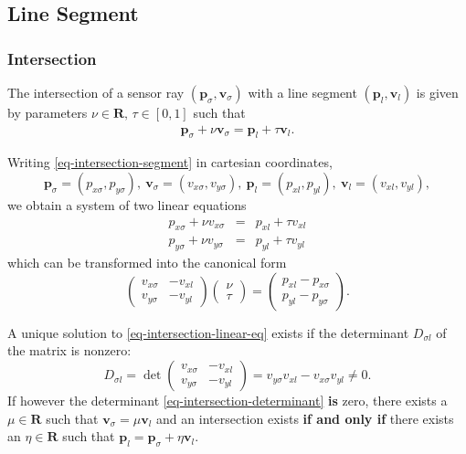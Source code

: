\documentclass[11pt]{article}
\newcommand{\Dsigl}{D_{\sigma l}}
\newcommand{\pbl}{\mathbf{p}_l}
\newcommand{\pbsig}{\mathbf{p}_\sigma}
\newcommand{\pxl}{p_{xl}}
\newcommand{\pyl}{p_{yl}}
\newcommand{\pxsig}{p_{x\sigma}}
\newcommand{\pysig}{p_{y\sigma}}
\newcommand{\Rb}{\mathbf{R}}
\newcommand{\vbl}{\mathbf{v}_l}
\newcommand{\vxl}{v_{xl}}
\newcommand{\vyl}{v_{yl}}
\newcommand{\vbsig}{\mathbf{v}_\sigma}
\newcommand{\vxsig}{v_{x\sigma}}
\newcommand{\vysig}{v_{y\sigma}}
\begin{document}
\subsection{Line Segment}
\label{sec-intersection-line-segment}

\subsubsection*{Intersection}

The intersection of a sensor ray $(\pbsig,\vbsig)$ with a line segment
$(\pbl,\vbl)$ is given by parameters $\nu\in\Rb,\,\tau\in[0,1]$ such that
\begin{eqnarray}
    \pbsig + \nu \vbsig = \pbl + \tau \vbl. \label{eq-intersection-segment}
\end{eqnarray}

Writing \eqref{eq-intersection-segment} in cartesian coordinates,
\begin{equation}
    \pbsig=(\pxsig, \pysig),\:
    \vbsig=(\vxsig, \vysig),\:
    \pbl=(\pxl, \pyl),\:
    \vbl=(\vxl, \vyl),\label{eq-intersection-cartesian}
\end{equation}
we obtain a system of two linear equations
\begin{eqnarray*}
    \pxsig + \nu \vxsig &=& \pxl + \tau \vxl \\
    \pysig + \nu \vysig &=& \pyl + \tau \vyl 
\end{eqnarray*}
which can be transformed into the canonical form
\begin{equation}
    \left(
        \begin{matrix}
            \vxsig & -\vxl \\ \vysig & -\vyl
        \end{matrix}
    \right)
    \left(
        \begin{matrix}
            \nu \\ \tau
        \end{matrix}
    \right)
    = 
    \left(
        \begin{matrix}
            \pxl - \pxsig \\ \pyl - \pysig 
        \end{matrix}
    \right).\label{eq-intersection-linear-eq}
\end{equation}

A unique solution to \eqref{eq-intersection-linear-eq} exists if the
determinant $\Dsigl$ of the matrix is nonzero:
\begin{equation}
    \Dsigl=\det\left(
        \begin{matrix}
            \vxsig & -\vxl \\ \vysig & -\vyl
        \end{matrix}
    \right)=
    \vysig\vxl - \vxsig\vyl \neq 0.\label{eq-intersection-determinant}
\end{equation}
If however the determinant \eqref{eq-intersection-determinant} \textbf{is} 
zero, there exists a $\mu\in\Rb$ such that $\vbsig=\mu\vbl$ and an 
intersection exists \textbf{if and only if} there exists an $\eta\in\Rb$ such 
that $\pbl = \pbsig + \eta\vbl$.
\end{document}
